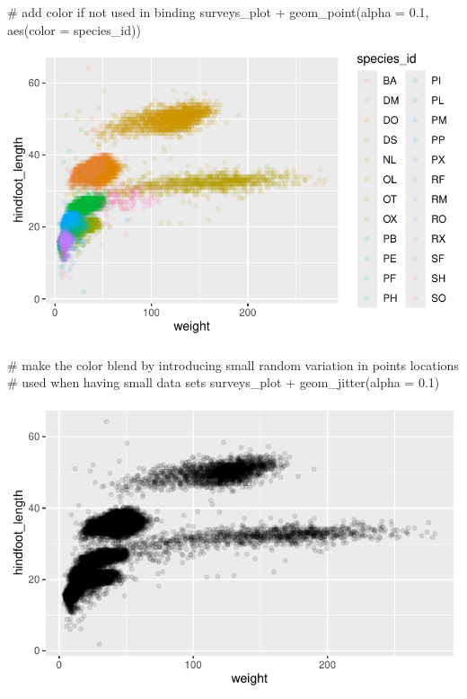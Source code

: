 \documentclass[
  letterpaper,
  DIV=11,
  numbers=noendperiod]{scrreprt}
\newenvironment{Shaded}{\begin{snugshade}}{\end{snugshade}}
\newcommand{\AttributeTok}[1]{\textcolor[rgb]{0.40,0.45,0.13}{#1}}
\newcommand{\CommentTok}[1]{\textcolor[rgb]{0.37,0.37,0.37}{#1}}
\newcommand{\FloatTok}[1]{\textcolor[rgb]{0.68,0.00,0.00}{#1}}
\newcommand{\FunctionTok}[1]{\textcolor[rgb]{0.28,0.35,0.67}{#1}}
\newcommand{\NormalTok}[1]{\textcolor[rgb]{0.00,0.23,0.31}{#1}}
\newcommand{\SpecialCharTok}[1]{\textcolor[rgb]{0.37,0.37,0.37}{#1}}
\begin{document}
\begin{Shaded}
\begin{Highlighting}[]
\CommentTok{\# add color if not used in binding}
\NormalTok{surveys\_plot }\SpecialCharTok{+} \FunctionTok{geom\_point}\NormalTok{(}\AttributeTok{alpha =} \FloatTok{0.1}\NormalTok{, }\FunctionTok{aes}\NormalTok{(}\AttributeTok{color =}\NormalTok{ species\_id))}
\end{Highlighting}
\end{Shaded}

\includegraphics{src/notebooks/r_files/figure-pdf/unnamed-chunk-43-4.pdf}

\begin{Shaded}
\begin{Highlighting}[]
\CommentTok{\# make the color blend by introducing small random variation in points locations}
\CommentTok{\# used when having small data sets}
\NormalTok{surveys\_plot }\SpecialCharTok{+} \FunctionTok{geom\_jitter}\NormalTok{(}\AttributeTok{alpha =} \FloatTok{0.1}\NormalTok{)}
\end{Highlighting}
\end{Shaded}

\includegraphics{src/notebooks/r_files/figure-pdf/unnamed-chunk-43-5.pdf}
\end{document}
